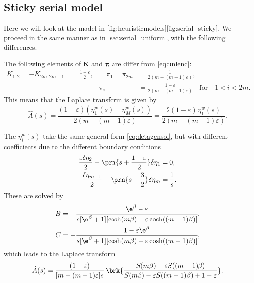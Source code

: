 \documentclass[12pt]{article}
\newcommand{\eqm}{\pi}
\newcommand{\eq}{\boldsymbol{\eqm}}
\newcommand{\etwm}{\eta^w}
\newcommand{\encm}{K}
\newcommand{\enc}{\mathbf{\encm}}
\begin{document}
\subsection{Sticky serial model}\label{sec:serial_sticky}

Here we will look at the model in \autoref{fig:heuristicmodels}\ref{fig:serial_sticky}.
We proceed in the same manner as in \autoref{sec:serial_uniform}, with the following differences.

The following elements of \(\enc\) and \(\eq\) are differ from \eqref{eq:unienc}:
%
\begin{equation}\label{eq:stickyenc}
  \begin{aligned}
  \encm_{1,2} = -\encm_{2m,2m-1} &= \frac{1-\varepsilon}{2},
  &\quad
  \eqm_1 = \eqm_{2m} &= \frac{1}{2(m-(m-1)\varepsilon)},
  \\ &&
  \eqm_i &=  \frac{1-\varepsilon}{2(m-(m-1)\varepsilon)}
  \quad\text{for}\quad 1<i<2m.
  \end{aligned}
\end{equation}
%
This means that the Laplace transform is given by
%
\begin{equation}\label{eq:stickyareaeta}
  \hat{A}(s) = \frac{(1-\varepsilon)(\etwm_1(s)-\etwm_M(s))}
                    {2(m-(m-1)\varepsilon)}
       = \frac{2(1-\varepsilon)\, \etwm_1(s)}{2(m-(m-1)\varepsilon)}.
\end{equation}
%

The \(\etwm_i(s)\) take the same general form \eqref{eq:detagensol}, but with different coefficients due to the different boundary conditions
%
\begin{equation}\label{eq:detabndsticky}
\begin{aligned}
  \frac{\varepsilon\delta\eta_2}{2} - \prn{s+\frac{1-\varepsilon}{2}}\delta\eta_1 &= 0, \\
  \frac{\delta\eta_{m-1}}{2} - \prn{s+\frac{3}{2}}\delta\eta_{m} &= \frac{1}{s}.
\end{aligned}
\end{equation}
%
These are solved by
%
\begin{equation}\label{eq:stickycoeffs}
\begin{aligned}
  B &= -\frac{\e^{\beta} - \varepsilon}
      {s [\e^{\beta} + 1] [\cosh(m\beta) - \varepsilon \cosh((m-1)\beta)]}, \\
  C &= -\frac{1 - \varepsilon\e^{\beta}}
      {s [\e^{\beta} + 1] [\cosh(m\beta) - \varepsilon \cosh((m-1)\beta)]},
\end{aligned}
\end{equation}
%
which leads to the Laplace transform
%
\begin{equation}\label{eq:stickylaplace}
  \hat{A}(s) = \frac{(1-\varepsilon)}{[m-(m-1)\varepsilon]s} \,
      \brk{\frac{S(m\beta) - \varepsilon S((m-1)\beta)}
      {S(m\beta) - \varepsilon S((m-1)\beta) + 1 - \varepsilon}}.
\end{equation}
%
\end{document}
